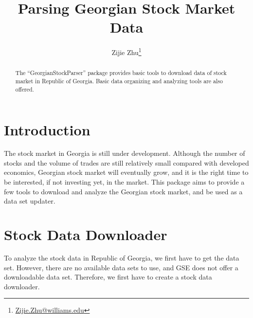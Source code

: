 \documentclass[a4paper]{article}
\begin{document}





\renewcommand\Authfont{\fontsize{12}{14.4}\selectfont}
\renewcommand\Affilfont{\fontsize{9}{10.8}\itshape}

\title{\textbf{Parsing Georgian Stock Market Data}}
\author{Zijie Zhu\thanks{\href{mailto:Zijie.Zhu@williams.edu}{Zijie.Zhu@williams.edu}}}
\maketitle


\tableofcontents

\begin{abstract}
The ``GeorgianStockParser'' package provides basic tools to download data of stock market in Republic of Georgia. Basic data organizing and analyzing tools are also offered.
\end{abstract}

\section{Introduction}
\label{sec:Introduction}

The stock market in Georgia is still under development. Although the number of stocks and the volume of trades are still relatively small compared with developed economics, Georgian stock market will eventually grow, and it is the right time to be interested, if not investing yet, in the market. This package aims to provide a few tools to download and analyze the Georgian stock market, and be used as a data set updater.

\section{Stock Data Downloader}
\label{sec:Downloader}

To analyze the stock data in Republic of Georgia, we first have to get the data set. However, there are no available data sets to use, and GSE does not offer a downloadable data set. Therefore, we first have to create a stock data downloader.
\end{document}
